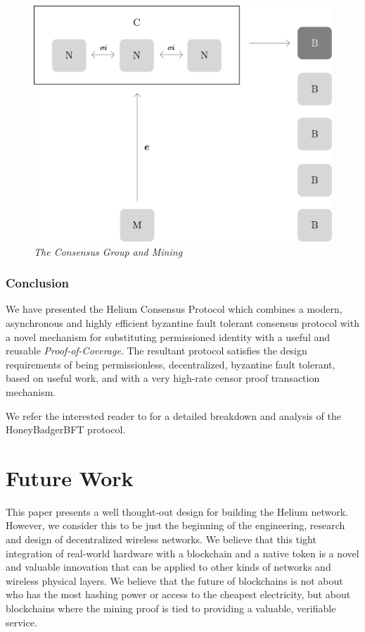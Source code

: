 \documentclass[10pt, nonatbib, nocopyrightspace, reprint]{sigplanconf}
\begin{document}
\begin{figure}[ht]
    \begin{center}
          \includegraphics[width=\columnwidth]{consensus_group.eps}
          \caption{\emph{The Consensus Group and Mining}}\label{fig:consensus-group}
     \end{center}
\end{figure}

\subsubsection{Conclusion}

We have presented the Helium Consensus Protocol which combines a modern, asynchronous and highly efficient byzantine fault tolerant consensus protocol with a novel mechanism for substituting permissioned identity with a useful and reusable \emph{Proof-of-Coverage}. The resultant protocol satisfies the design requirements of being permissionless, decentralized, byzantine fault tolerant, based on useful work, and with a very high-rate censor proof transaction mechanism.

We refer the interested reader to \cite{honeybadger} for a detailed breakdown and analysis of the HoneyBadgerBFT protocol.

\section{Future Work}

This paper presents a well thought-out design for building the Helium network. However, we consider this to be just the beginning of the engineering, research and design of decentralized wireless networks. We believe that this tight integration of real-world hardware with a blockchain and a native token is a novel and valuable innovation that can be applied to other kinds of networks and wireless physical layers. We believe that the future of blockchains is not about who has the most hashing power or access to the cheapest electricity, but about blockchains where the mining proof is tied to providing a valuable, verifiable service.
\end{document}
